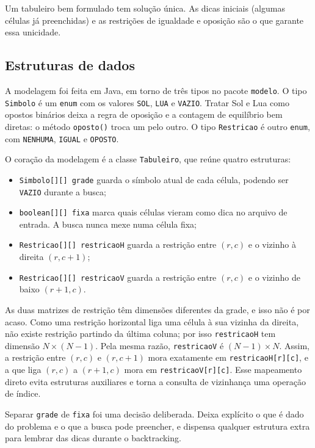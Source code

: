 \documentclass[12pt]{article}
\begin{document}
Um tabuleiro bem formulado tem solução única. As dicas iniciais (algumas células já preenchidas) e as restrições de igualdade e oposição são o que garante essa unicidade.

\subsection{Estruturas de dados}

A modelagem foi feita em Java, em torno de três tipos no pacote \texttt{modelo}. O tipo \texttt{Simbolo} é um \texttt{enum} com os valores \texttt{SOL}, \texttt{LUA} e \texttt{VAZIO}. Tratar Sol e Lua como opostos binários deixa a regra de oposição e a contagem de equilíbrio bem diretas: o método \texttt{oposto()} troca um pelo outro. O tipo \texttt{Restricao} é outro \texttt{enum}, com \texttt{NENHUMA}, \texttt{IGUAL} e \texttt{OPOSTO}.

O coração da modelagem é a classe \texttt{Tabuleiro}, que reúne quatro estruturas:

\begin{itemize}
  \item \texttt{Simbolo[][] grade} guarda o símbolo atual de cada célula, podendo ser \texttt{VAZIO} durante a busca;
  \item \texttt{boolean[][] fixa} marca quais células vieram como dica no arquivo de entrada. A busca nunca mexe numa célula fixa;
  \item \texttt{Restricao[][] restricaoH} guarda a restrição entre $(r,c)$ e o vizinho à direita $(r,c+1)$;
  \item \texttt{Restricao[][] restricaoV} guarda a restrição entre $(r,c)$ e o vizinho de baixo $(r+1,c)$.
\end{itemize}

As duas matrizes de restrição têm dimensões diferentes da grade, e isso não é por acaso. Como uma restrição horizontal liga uma célula à sua vizinha da direita, não existe restrição partindo da última coluna; por isso \texttt{restricaoH} tem dimensão $N \times (N-1)$. Pela mesma razão, \texttt{restricaoV} é $(N-1) \times N$. Assim, a restrição entre $(r,c)$ e $(r,c+1)$ mora exatamente em \texttt{restricaoH[r][c]}, e a que liga $(r,c)$ a $(r+1,c)$ mora em \texttt{restricaoV[r][c]}. Esse mapeamento direto evita estruturas auxiliares e torna a consulta de vizinhança uma operação de índice.

Separar \texttt{grade} de \texttt{fixa} foi uma decisão deliberada. Deixa explícito o que é dado do problema e o que a busca pode preencher, e dispensa qualquer estrutura extra para lembrar das dicas durante o backtracking.
\end{document}
